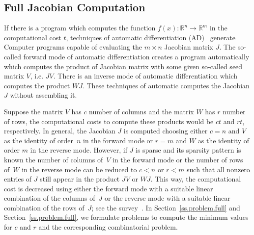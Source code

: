 \documentclass[12pt, twoside]{book}
\newcommand{\secref}[1]{Section~\protect\ref{#1}}
\newcommand{\setR}{\ensuremath{\mathbb{R}}}
\newcommand{\col}{\ensuremath{c}}
\newcommand{\row}{\ensuremath{r}}
\begin{document}
\subsection{Full Jacobian Computation}
\label{s.full.jac}
If there is a program which computes the function $f(x) : \setR^n \rightarrow \setR^m$
in the computational cost $t$,
techniques of automatic differentiation (AD)~\cite{Griewank2008EDP,Rall1981ADT} generate
Computer programs capable of evaluating the $m \times n$ Jacobian matrix $J$.
The so-called forward mode of automatic differentiation creates a program automatically
which computes the product of Jacobian matrix with some given so-called seed matrix $V$,
i.e. $JV$. There is an inverse mode of automatic differentiation which computes the product $WJ$.
These techniques of automatic computes the Jacobian $J$ without assembling it.

Suppose the matrix $V$ has $\col$ number of columns and the matrix $W$ has $\row$ number of rows,
the computational costs to compute these products would be $\col t$ and $\row t$, respectively.
In general, the Jacobian $J$ is computed choosing either $c=n$ and $V$ as the identity of
order~$n$ in the forward mode or $r = m$ and $W$ as the identity of order $m$ in the
reverse mode. However, if $J$ is sparse and its sparsity pattern is known the number of
columns of~$V$ in the forward mode or the number of rows of~$W$ in the reverse mode can
be reduced to $\col < n$ or $\row < m$ such that all nonzero entries of $J$ still appear
in the product $JV$ or $WJ$. This way, the computational cost is decreased using either
the forward mode with a suitable linear combination of the columns of~$J$ or the reverse
mode with a suitable linear combination of the rows of~$J$; see the
survey~\cite{Gebremedhin05whatcolor}.
In \secref{ss.problem.full} and \secref{ss.problem.full}, we formulate problems to compute the
minimum values for $\col$ and $\row$ and the corresponding combinatorial problem.
\end{document}
